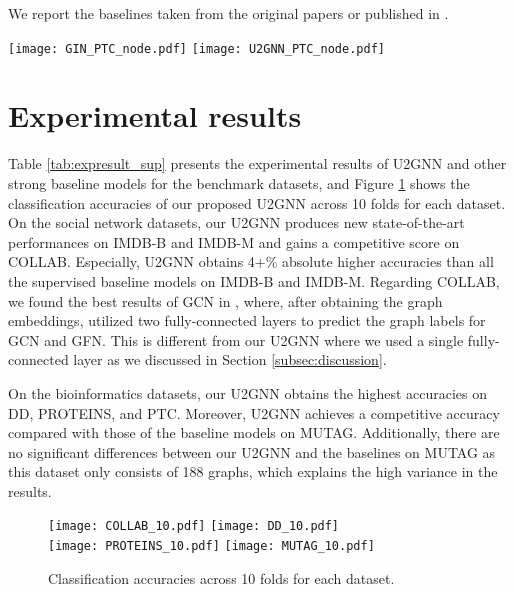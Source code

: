\documentclass[twoside,leqno,twocolumn]{article}
\newcommand{\citet}{\cite}
\newcommand{\citep}{\cite}
\begin{document}
We report the baselines taken from the original papers or published in \citep{ivanov2018anonymous,verma2018graph,xinyi2019capsule,FAN2020107084,Chen2019ArePG,seo2019discriminative}.


\begin{figure*}[ht]
\centering
    \texttt{[image: GIN\_PTC\_node.pdf]}
    \texttt{[image: U2GNN\_PTC\_node.pdf]}
\caption[short]{A t-SNE visualization of the node embeddings learned by GIN-0 and our U2GNN on the PTC dataset.}
\label{fig:visualembeddings}
\end{figure*}

\section{Experimental results} 
\label{subsec:expresults}

Table \ref{tab:expresult_sup} presents the experimental results of U2GNN and other strong baseline models for the benchmark datasets,
and Figure \ref{fig:resultsof10folds} shows the classification accuracies of our proposed U2GNN across 10 folds for each dataset.
On the social network datasets, our U2GNN produces new state-of-the-art performances on IMDB-B and IMDB-M and gains a competitive score on COLLAB.
Especially, U2GNN obtains 4+\% absolute higher accuracies than all the supervised baseline models on IMDB-B and IMDB-M.
Regarding COLLAB, we found the best results of GCN in \citep{Chen2019ArePG}, where, after obtaining the graph embeddings, \citet{Chen2019ArePG} utilized two fully-connected layers to predict the graph labels for GCN and GFN. 
This is different from our U2GNN where we used a single fully-connected layer as we discussed in Section \ref{subsec:discussion}.


On the bioinformatics datasets, our U2GNN obtains the highest accuracies on DD, PROTEINS, and PTC. 
Moreover, U2GNN achieves a competitive accuracy compared with those of the baseline models on MUTAG. 
Additionally, there are no significant differences between our U2GNN and the baselines on MUTAG as this dataset only consists of 188 graphs, which explains the high variance in the results.

\begin{figure}[ht]
\centering
    \texttt{[image: COLLAB\_10.pdf]}
\texttt{[image: DD\_10.pdf]}\\
    \texttt{[image: PROTEINS\_10.pdf]}
    \texttt{[image: MUTAG\_10.pdf]}
\caption[short]{Classification accuracies across 10 folds for each dataset.}
\label{fig:resultsof10folds}
\end{figure}
\end{document}
